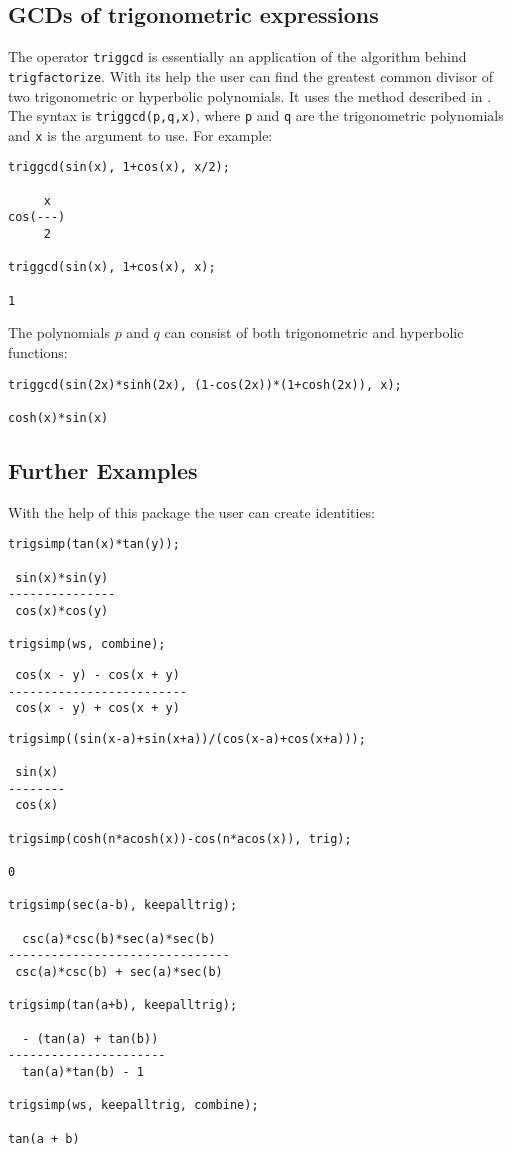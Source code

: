\subsection{GCDs of trigonometric expressions}
\hypertarget{operator:TRIGGCD}{}

The operator \texttt{triggcd} is essentially an application of the
algorithm behind \texttt{trigfactorize}.  With its help the user can
find the greatest common divisor of two trigonometric or hyperbolic
polynomials.  It uses the method described in \cite{Roach:Talk}.  The syntax
is \texttt{triggcd(p,q,x)}, where \texttt{p} and \texttt{q} are the
trigonometric polynomials and \texttt{x} is the argument to use.  For
example:
\begin{verbatim}
triggcd(sin(x), 1+cos(x), x/2);

     x
cos(---)
     2

triggcd(sin(x), 1+cos(x), x);

1
\end{verbatim}
The polynomials $p$ and $q$ can consist of both trigonometric and
hyperbolic functions:
\begin{verbatim}
triggcd(sin(2x)*sinh(2x), (1-cos(2x))*(1+cosh(2x)), x);

cosh(x)*sin(x)
\end{verbatim}


\subsection{Further Examples}

With the help of this package the user can create identities:
\begin{verbatim}
trigsimp(tan(x)*tan(y));

 sin(x)*sin(y)
---------------
 cos(x)*cos(y)

trigsimp(ws, combine);
\end{verbatim}

{\samepage
\begin{verbatim}
 cos(x - y) - cos(x + y)
-------------------------
 cos(x - y) + cos(x + y)
\end{verbatim}}

\begin{verbatim}
trigsimp((sin(x-a)+sin(x+a))/(cos(x-a)+cos(x+a)));

 sin(x)
--------
 cos(x)

trigsimp(cosh(n*acosh(x))-cos(n*acos(x)), trig);

0

trigsimp(sec(a-b), keepalltrig);

  csc(a)*csc(b)*sec(a)*sec(b)
-------------------------------
 csc(a)*csc(b) + sec(a)*sec(b)

trigsimp(tan(a+b), keepalltrig);

  - (tan(a) + tan(b))
----------------------
  tan(a)*tan(b) - 1

trigsimp(ws, keepalltrig, combine);

tan(a + b)
\end{verbatim}

